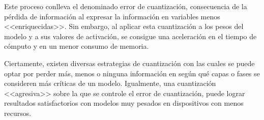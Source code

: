 \documentclass[12pt, a4paper, twoside]{article}
\begin{document}
Este proceso conlleva el denominado error de cuantización, consecuencia de la pérdida de información al expresar la información en variables menos <<enriquecidas>>. Sin embargo, al aplicar esta cuantización a los pesos del modelo y a sus valores de activación, se consigue una aceleración en el tiempo de cómputo y en un menor consumo de memoria.

Ciertamente, existen diversas estrategias de cuantización con las cuales se puede optar por perder más, menos o ninguna información en según qué capas o fases se consideren más críticas de un modelo. Igualmente, una cuantización <<agresiva>> sobre la que se controle el error de cuantización, puede lograr resultados satisfactorios con modelos muy pesados en dispositivos con menos recursos. \cite{jrgensen-2025}

%
%

%
%	
%	
%
%	
\end{document}
